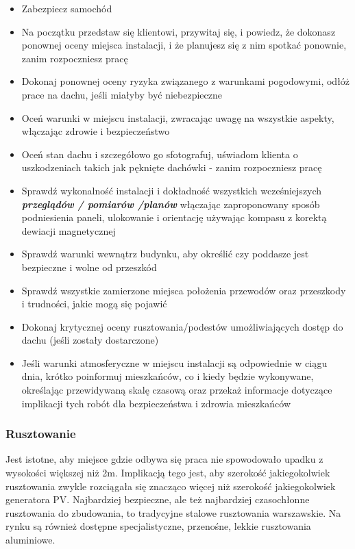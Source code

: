 \documentclass[12pt,a4paper]{article}
\begin{document}
\begin{itemize}
\item Zabezpiecz samochód 
\item Na początku przedstaw się klientowi, przywitaj się, i powiedz, że 
dokonasz ponownej oceny miejsca instalacji, i że planujesz się z nim 
spotkać ponownie, zanim rozpoczniesz pracę 
\item Dokonaj ponownej oceny ryzyka związanego z warunkami pogodowymi, 
odłóż prace na dachu, jeśli miałyby być niebezpieczne 
\item Oceń warunki w miejscu instalacji, zwracając uwagę na wszystkie 
aspekty, włączając zdrowie i bezpieczeństwo 
\item Oceń stan dachu i szczegółowo go sfotografuj, uświadom klienta o 
uszkodzeniach takich jak pęknięte dachówki - zanim rozpoczniesz pracę 
\item Sprawdź wykonalność instalacji i dokładność wszystkich 
wcześniejszych \textbf{\textit{przeglądów / pomiarów /planów}} 
włączając zaproponowany sposób podniesienia paneli, ulokowanie i 
orientację używając kompasu z korektą dewiacji magnetycznej 
\item Sprawdź warunki wewnątrz budynku, aby określić czy poddasze jest 
bezpieczne i wolne od przeszkód 
\item Sprawdź wszystkie zamierzone miejsca położenia przewodów oraz 
przeszkody i trudności, jakie mogą się pojawić 
\item Dokonaj krytycznej oceny rusztowania/podestów umożliwiających 
dostęp do dachu (jeśli zostały dostarczone) 
\item Jeśli warunki atmosferyczne w miejscu instalacji są odpowiednie w 
ciągu dnia, krótko poinformuj mieszkańców, co i kiedy będzie wykonywane, 
określając przewidywaną skalę czasową oraz przekaż informacje dotyczące 
implikacji tych robót dla bezpieczeństwa i zdrowia mieszkańców 
\end{itemize}
 

\subsubsection{Rusztowanie }


Jest istotne, aby miejsce gdzie odbywa się praca nie spowodowało upadku 
z wysokości większej niż 2m. Implikacją tego jest, aby szerokość 
jakiegokolwiek rusztowania zwykle rozciągała się znacząco więcej niż 
szerokość jakiegokolwiek generatora PV. Najbardziej bezpieczne, ale też 
najbardziej czasochłonne rusztowania do zbudowania, to tradycyjne 
stalowe rusztowania warszawskie. Na rynku są również dostępne 
specjalistyczne, przenośne, lekkie rusztowania aluminiowe. 
\end{document}
